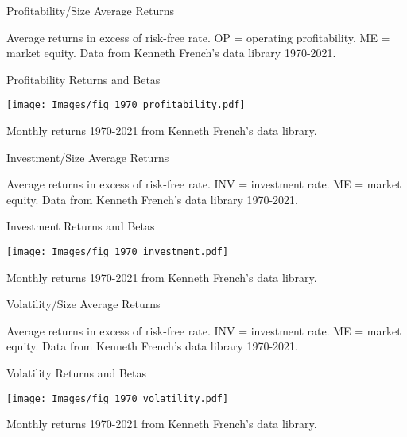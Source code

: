 \documentclass[xcolor=dvipsnames,10pt]{beamer}
\begin{document}
\begin{frame}{Profitability/Size Average Returns}
     \begin{center}
        
    \end{center}
     Average returns in excess of risk-free rate. OP = operating profitability.  ME = market equity.  Data from Kenneth French's data library 1970-2021.
\end{frame}

\begin{frame}{Profitability Returns and Betas}
   \begin{center}
        \texttt{[image: Images/fig\_1970\_profitability.pdf]}
    \end{center}
     Monthly returns 1970-2021 from Kenneth French's data library.
\end{frame}

\begin{frame}{Investment/Size Average Returns}
     \begin{center}
        
    \end{center}
    Average returns in excess of risk-free rate. INV = investment rate.  ME = market equity.  Data from Kenneth French's data library 1970-2021.
\end{frame}

\begin{frame}{Investment Returns and Betas}
   \begin{center}
        \texttt{[image: Images/fig\_1970\_investment.pdf]}
    \end{center}
     Monthly returns 1970-2021 from Kenneth French's data library.
\end{frame}

\begin{frame}{Volatility/Size Average Returns}
     \begin{center}
        
    \end{center}
    Average returns in excess of risk-free rate. INV = investment rate.  ME = market equity.  Data from Kenneth French's data library 1970-2021.
\end{frame}

\begin{frame}{Volatility Returns and Betas}
   \begin{center}
        \texttt{[image: Images/fig\_1970\_volatility.pdf]}
    \end{center}
     Monthly returns 1970-2021 from Kenneth French's data library.
\end{frame}
\end{document}
